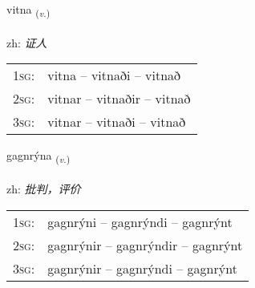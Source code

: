 \documentclass[frontgrid, backgrid]{flacards}\usepackage[]{graphicx}\usepackage[]{color}
\begin{document}
\renewcommand{\flhead}{\vskip5pt \fboxsep=0pt {\small\bfseries\footnotesize Sagnorð | 动词}}
\renewcommand{\fcfoot}{\vskip5pt \fboxsep=0pt \hspace{2pt}{\small\bfseries\footnotesize 2K}}

\renewcommand{\blhead}{\vskip5pt {\small\bfseries\footnotesize Sagnorð | 动词 }}
\renewcommand{\bcfoot}{\vskip5pt \hspace{2pt}{\small\bfseries\footnotesize 2K}}


{vitna \small{\textsubscript{(\textit{v.})}} \\[1ex] %
\textphonetic{[vɪhtna]} \\
zh: \emph{证人} \\  [2ex]
\renewcommand*{\arraystretch}{0.8}
\begin{tabular}{p{1cm}l}
\textsc{1sg}: & vitna -- vitnaði -- vitnað \\ 
\textsc{2sg}: & vitnar -- vitnaðir -- vitnað \\ 
\textsc{3sg}: & vitnar -- vitnaði -- vitnað \\ 
\end{tabular}
}

\renewcommand{\flhead}{\vskip5pt \fboxsep=0pt {\small\bfseries\footnotesize Sagnorð | 动词}}
\renewcommand{\fcfoot}{\vskip5pt \fboxsep=0pt \hspace{2pt}{\small\bfseries\footnotesize 2K}}

\renewcommand{\blhead}{\vskip5pt {\small\bfseries\footnotesize Sagnorð | 动词 }}
\renewcommand{\bcfoot}{\vskip5pt \hspace{2pt}{\small\bfseries\footnotesize 2K}}


{gagnrýna \small{\textsubscript{(\textit{v.})}} \\[1ex] %
\textphonetic{[kakrina]} \\
zh: \emph{批判，评价} \\  [2ex]
\renewcommand*{\arraystretch}{0.8}
\begin{tabular}{p{1cm}l}
\textsc{1sg}: & gagnrýni -- gagnrýndi -- gagnrýnt \\ 
\textsc{2sg}: & gagnrýnir -- gagnrýndir -- gagnrýnt \\ 
\textsc{3sg}: & gagnrýnir -- gagnrýndi -- gagnrýnt \\ 
\end{tabular}
}
\end{document}
